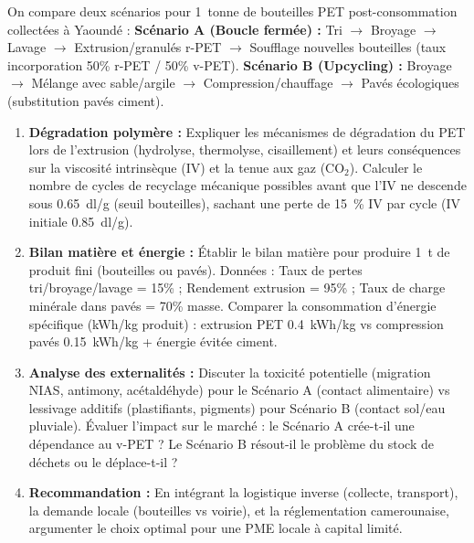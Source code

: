 \documentclass[11pt]{article}
\begin{document}
\begin{exercice}
On compare deux scénarios pour \SI{1}{tonne} de bouteilles PET post-consommation collectées à Yaoundé :
\textbf{Scénario A (Boucle fermée) :} Tri $\rightarrow$ Broyage $\rightarrow$ Lavage $\rightarrow$ Extrusion/granulés r-PET $\rightarrow$ Soufflage nouvelles bouteilles (taux incorporation 50\% r-PET / 50\% v-PET).
\textbf{Scénario B (Upcycling) :} Broyage $\rightarrow$ Mélange avec sable/argile $\rightarrow$ Compression/chauffage $\rightarrow$ Pavés écologiques (substitution pavés ciment).
\begin{enumerate}
    \item \textbf{Dégradation polymère :} Expliquer les mécanismes de dégradation du PET lors de l'extrusion (hydrolyse, thermolyse, cisaillement) et leurs conséquences sur la viscosité intrinsèque (IV) et la tenue aux gaz (CO$_2$). Calculer le nombre de cycles de recyclage mécanique possibles avant que l'IV ne descende sous \SI{0,65}{dl/g} (seuil bouteilles), sachant une perte de \SI{15}{\%} IV par cycle (IV initiale \SI{0,85}{dl/g}).
    \item \textbf{Bilan matière et énergie :} Établir le bilan matière pour produire \SI{1}{t} de produit fini (bouteilles ou pavés). Données : Taux de pertes tri/broyage/lavage = 15\% ; Rendement extrusion = 95\% ; Taux de charge minérale dans pavés = 70\% masse. Comparer la consommation d'énergie spécifique (kWh/kg produit) : extrusion PET \SI{0,4}{kWh/kg} vs compression pavés \SI{0,15}{kWh/kg} + énergie évitée ciment.
    \item \textbf{Analyse des externalités :} Discuter la toxicité potentielle (migration NIAS, antimony, acétaldéhyde) pour le Scénario A (contact alimentaire) vs lessivage additifs (plastifiants, pigments) pour Scénario B (contact sol/eau pluviale). Évaluer l'impact sur le marché : le Scénario A crée-t-il une dépendance au v-PET ? Le Scénario B résout-il le problème du stock de déchets ou le déplace-t-il ?
    \item \textbf{Recommandation :} En intégrant la logistique inverse (collecte, transport), la demande locale (bouteilles vs voirie), et la réglementation camerounaise, argumenter le choix optimal pour une PME locale à capital limité.
\end{enumerate}
\end{exercice}
\end{document}
